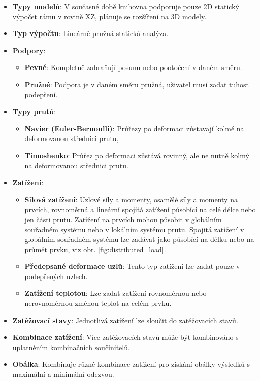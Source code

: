\begin{itemize}
    \item \textbf{Typy modelů}: V současné době knihovna podporuje pouze 2D statický výpočet rámu v rovině \gls{X}\gls{Z}, plánuje se rozšíření na 3D modely.
    \item \textbf{Typ výpočtu}: Lineárně pružná statická analýza.
    \item \textbf{Podpory}: 
        \begin{itemize}
            \item \textbf{Pevné}: Kompletně zabraňují posunu nebo pootočení v daném směru.
            \item \textbf{Pružné}: Podpora je v daném směru pružná, uživatel musí zadat tuhost podepření.
        \end{itemize}
    \item \textbf{Typy prutů}:
        \begin{itemize}
            \item \textbf{Navier (Euler-Bernoulli)}: Průřezy po deformaci zůstavají kolmé na deformovanou střednici prutu,
            \item \textbf{Timoshenko}: Průřez po deformaci zůstává rovinný, ale ne nutně kolmý na deformovanou střednici prutu.
        \end{itemize}
    \item \textbf{Zatížení}:
        \begin{itemize}
            \item \textbf{Silová zatížení}: Uzlové síly a momenty, osamělé síly a momenty na prvcích, rovnoměrná a lineární spojitá zatížení působící na celé délce nebo jen části prutu. Zatížení na prvcích mohou působit v globálním souřadném systému nebo v lokálním systému prutu. Spojitá zatížení v globálním souřadném systému lze zadávat jako působící na délku nebo na průmět prvku, viz obr. \ref{fig:distributed_load}.
            \item \textbf{Předepsané deformace uzlů}: Tento typ zatížení lze zadat pouze v podepřených uzlech.
            \item \textbf{Zatížení teplotou}: Lze zadat zatížení rovnoměrnou nebo nerovnoměrnou změnou teplot na celém prvku.
        \end{itemize}
    \item \textbf{Zatěžovací stavy}: Jednotlivá zatížení lze sloučit do zatěžovacích stavů.
    \item \textbf{Kombinace zatížení}: Více zatěžovacích stavů může být kombinováno s uplatněním kombinačních součinitelů.
    \item \textbf{Obálka}: Kombinuje různé kombinace zatížení pro získání obálky výsledků s maximální a minimální odezvou.
\end{itemize}


